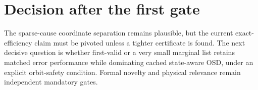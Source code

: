 \documentclass[11pt]{article}
\begin{document}
\section{Decision after the first gate}
The sparse-cause coordinate separation remains plausible, but the current
exact-efficiency claim must be pivoted unless a tighter certificate is found.
The next decisive question is whether first-valid or a very small marginal list
retains matched error performance while dominating cached state-aware OSD, under
an explicit orbit-safety condition.  Formal novelty and physical relevance
remain independent mandatory gates.
\end{document}
